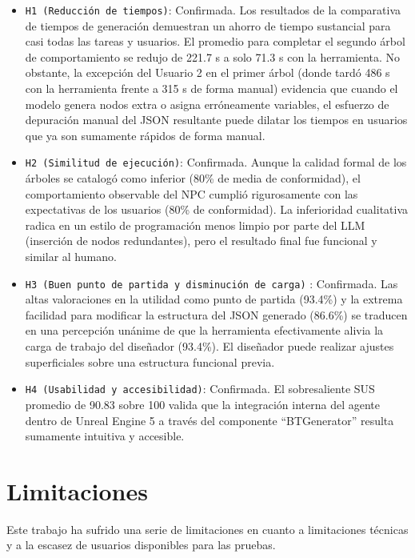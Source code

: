 \begin{itemize}
    \item \texttt{H1 (Reducción de tiempos)}: Confirmada.
    Los resultados de la comparativa de tiempos de generación demuestran un ahorro de tiempo sustancial para casi todas las tareas y usuarios.
    El promedio para completar el segundo árbol de comportamiento se redujo de 221.7 s a solo 71.3 s con la herramienta. 
    No obstante, la excepción del Usuario 2 en el primer árbol (donde tardó 486 s con la herramienta frente a 315 s de forma manual) evidencia que cuando el modelo genera nodos extra o asigna erróneamente variables, el esfuerzo de depuración manual del JSON resultante puede dilatar los tiempos en usuarios que ya son sumamente rápidos de forma manual.
    \item \texttt{H2 (Similitud de ejecución)}: Confirmada.
    Aunque la calidad formal de los árboles se catalogó como inferior (80\% de media de conformidad), el comportamiento observable del NPC cumplió rigurosamente con las expectativas de los usuarios (80\% de conformidad).
    La inferioridad cualitativa radica en un estilo de programación menos limpio por parte del LLM (inserción de nodos redundantes), pero el resultado final fue funcional y similar al humano.
    \item \texttt{H3 (Buen punto de partida y disminución de carga)} : Confirmada.
    Las altas valoraciones en la utilidad como punto de partida (93.4\%) y la extrema facilidad para modificar la estructura del JSON generado (86.6\%) se traducen en una percepción unánime de que la herramienta efectivamente alivia la carga de trabajo del diseñador (93.4\%).
    El diseñador puede realizar ajustes superficiales sobre una estructura funcional previa.
    \item \texttt{H4 (Usabilidad y accesibilidad)}: Confirmada.
    El sobresaliente SUS promedio de 90.83 sobre 100 valida que la integración interna del agente dentro de Unreal Engine 5 a través del componente ``BTGenerator'' resulta sumamente intuitiva y accesible.
\end{itemize}

\section{Limitaciones}
\label{sec:Limitaciones}

Este trabajo ha sufrido una serie de limitaciones en cuanto a limitaciones técnicas y a la escasez de usuarios disponibles para las pruebas.


